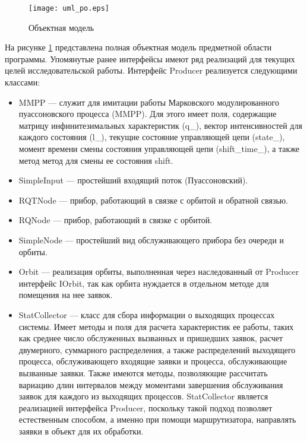 \begin{figure}[H]
	\centering
	\texttt{[image: uml\_po.eps]}
	\caption{Объектная модель}
	\label{uml_po}
\end{figure}
На рисунке \ref{uml_po} представлена полная объектная модель предметной области программы. Упомянутые ранее интерфейсы имеют ряд реализаций для текущих целей исследовательской работы. Интерфейс Producer реализуется следующими классами:
\begin{itemize}
	\item MMPP --- служит для имитации работы Марковского модулированного пуассоновского процесса (MMPP). Для этого имеет поля, содержащие матрицу инфинитезимальных характеристик (q\_), вектор интенсивностей для каждого состояния (l\_), текущие состояние управляющей цепи (state\_), момент времени смены состояния управляющей цепи (shift\_time\_), а также метод метод для смены ее состояния shift.
	\item SimpleInput --- простейший входящий поток (Пуассоновский).
	\item RQTNode --- прибор, работающий в связке с орбитой и обратной связью.
	\item RQNode --- прибор, работающий в связке с орбитой.
	\item SimpleNode --- простейший вид обслуживающего прибора без очереди и орбиты.
	\item Orbit --- реализация орбиты, выполненная через наследованный от Producer интерфейс IOrbit, так как орбита нуждается в отдельном методе для помещения на нее заявок.
	\item StatCollector --- класс для сбора информации о выходящих процессах системы. Имеет методы и поля для расчета характеристик ее работы, таких как среднее число обслуженных вызванных и пришедших заявок, расчет двумерного, суммарного распределения, а также распределений выходящего процесса, обслуживающего входящие заявки и процесса, обслуживающие вызванные заявки. Также имеются методы, позволяющие рассчитать вариацию длин интервалов между моментами завершения обслуживания заявок для каждого из выходящих процессов. StatCollector является реализацией интерфейса Producer, поскольку такой подход позволяет естественным способом, а именно при помощи маршрутизатора, направлять заявки в объект для их обработки.
\end{itemize}
